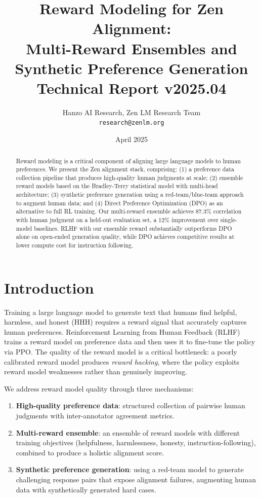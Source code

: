 \documentclass[11pt,a4paper]{article}
\title{\textbf{Reward Modeling for Zen Alignment:\\
Multi-Reward Ensembles and Synthetic Preference Generation}\\
\large Technical Report v2025.04}
\author{Hanzo AI Research, Zen LM Research Team\\
\texttt{research@zenlm.org}}
\date{April 2025}
\begin{document}
\maketitle

\begin{abstract}
Reward modeling is a critical component of aligning large language models to human
preferences. We present the Zen alignment stack, comprising: (1) a preference data
collection pipeline that produces high-quality human judgments at scale;
(2) ensemble reward models based on the Bradley-Terry statistical model with
multi-head architecture; (3) synthetic preference generation using a red-team/blue-team
approach to augment human data; and (4) Direct Preference Optimization (DPO) as an
alternative to full RL training. Our multi-reward ensemble achieves 87.3\% correlation
with human judgment on a held-out evaluation set, a 12\% improvement over single-model
baselines. RLHF with our ensemble reward substantially outperforms DPO alone on
open-ended generation quality, while DPO achieves competitive results at lower compute
cost for instruction following.
\end{abstract}

\tableofcontents
\newpage

\section{Introduction}
\label{sec:intro}

Training a large language model to generate text that humans find helpful, harmless, and
honest (HHH) \cite{askell2021general} requires a reward signal that accurately captures
human preferences. Reinforcement Learning from Human Feedback (RLHF)
\cite{christiano2017deep,ouyang2022training} trains a reward model on preference data and
then uses it to fine-tune the policy via PPO. The quality of the reward model is a
critical bottleneck: a poorly calibrated reward model produces \emph{reward hacking},
where the policy exploits reward model weaknesses rather than genuinely improving.

We address reward model quality through three mechanisms:

\begin{enumerate}
    \item \textbf{High-quality preference data}: structured collection of pairwise human
          judgments with inter-annotator agreement metrics.
    \item \textbf{Multi-reward ensemble}: an ensemble of reward models with different
          training objectives (helpfulness, harmlessness, honesty, instruction-following),
          combined to produce a holistic alignment score.
    \item \textbf{Synthetic preference generation}: using a red-team model to generate
          challenging response pairs that expose alignment failures, augmenting human data
          with synthetically generated hard cases.
\end{enumerate}
\end{document}
